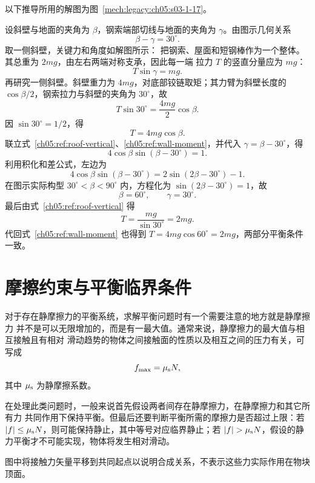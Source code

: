 {\begin{xesolution}
以下推导所用的解图为图~\ref{mech:legacy:ch05:s03-1-17}。

设斜壁与地面的夹角为 $\beta$，钢索端部切线与地面的夹角为 $\gamma$。由图示几何关系
\[
  \beta-\gamma=30^\circ.
\]
取一侧斜壁，关键力和角度如解图所示：
\soldiagOneSeventeen
把钢索、屋面和短钢棒作为一个整体。其总重为 $2mg$，由左右两端对称支承，因此每一端
拉力 $T$ 的竖直分量应为 $mg$：
\begin{equation}\label{ch05:ref:roof-vertical}
  T\sin\gamma=mg.
\end{equation}
再研究一侧斜壁。斜壁重力为 $4mg$，对底部铰链取矩；其力臂为斜壁长度的
$\cos\beta/2$，钢索拉力与斜壁的夹角为 $30^\circ$，故
\[
  T\sin30^\circ=\frac{4mg}{2}\cos\beta.
\]
因 $\sin30^\circ=1/2$，得
\begin{equation}\label{ch05:ref:wall-moment}
 T=4mg\cos\beta.
\end{equation}
联立式~\eqref{ch05:ref:roof-vertical}、\eqref{ch05:ref:wall-moment}，并代入 $\gamma=\beta-30^\circ$，得
\[
  4\cos\beta\sin(\beta-30^\circ)=1.
\]
利用积化和差公式，左边为
\[
  4\cos\beta\sin(\beta-30^\circ)
  =2\sin(2\beta-30^\circ)-1.
\]
在图示实际构型 $30^\circ<\beta<90^\circ$ 内，方程化为
$\sin(2\beta-30^\circ)=1$，故
\[
  \boxed{\beta=60^\circ},\qquad \gamma=30^\circ.
\]
最后由式~\eqref{ch05:ref:roof-vertical} 得
\[
  \boxed{T=\frac{mg}{\sin30^\circ}=2mg}.
\]
代回式~\eqref{ch05:ref:wall-moment} 也得到 $T=4mg\cos60^\circ=2mg$，两部分平衡条件一致。
\end{xesolution}

\section{摩擦约束与平衡临界条件}

对于存在静摩擦力的平衡系统，求解平衡问题时有一个需要注意的地方就是静摩擦力
并不是可以无限增加的，而是有一最大值。通常来说，静摩擦力的最大值与相互接触且有相对
滑动趋势的物体之间接触面的性质以及相互之间的压力有关，可写成
\[
  f_{\max}=\mu_{\rm s}N,
\]
其中 $\mu_{\rm s}$ 为静摩擦系数。

在处理此类问题时，一般来说首先假设两者间存在静摩擦力，在静摩擦力和其它所有力
共同作用下保持平衡。但最后还要判断平衡所需的摩擦力是否超过上限：若
$|f|\le\mu_{\rm s}N$，则可能保持静止，其中等号对应临界静止；若
$|f|>\mu_{\rm s}N$，假设的静力平衡才不可能实现，物体将发生相对滑动。

\label{ch05:fig:s03-1-2}
图中将接触力矢量平移到共同起点以说明合成关系，不表示这些力实际作用在物块顶面。

}
